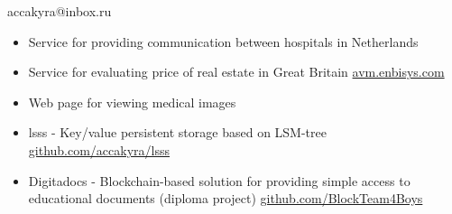 \documentclass[]{cv-style}
\begin{document}

\begin{aside}
    \color{white} \LARGE{accakyra@inbox.ru}
\end{aside}

\vspace{7.9cm}



\vspace{0.7cm}


{\Large{}}

\begin{itemize}
    \item {\large {Service for providing communication between hospitals in Netherlands}}
    \item {\large {Service for evaluating price of real estate in Great     Britain \url{avm.enbisys.com}}}
    \item {\large Web page for viewing medical images}
\end{itemize}

{\small\makebox[0.2\linewidth][l]{\faCalendar\hspace{0.5em}{2018 November -- 2020 July}}}

\vspace{0.7cm}


\begin{itemize}
    \item {\large {lsss - Key/value persistent storage based on LSM-tree \href{https://github.com/accakyra/lsss}{github.com/accakyra/lsss}}}
    \item {\large {Digitadocs - Blockchain-based solution for providing simple access to educational documents
    \hfill \break
    (diploma project) \href{https://github.com/BlockTeam4Boys}{github.com/BlockTeam4Boys}}}
\end{itemize}

\vspace{0.5cm}


\vspace{0.7cm}



\vspace{0.7cm}
\end{document}
